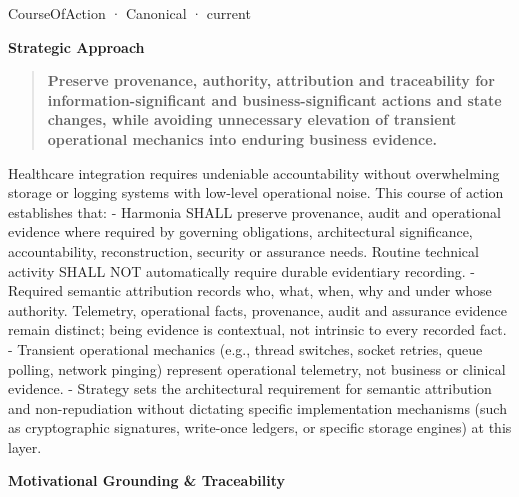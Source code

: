 \label{element:fd00bdbdc2234a208c5045aa69279db8}
{\small CourseOfAction · Canonical · current}\par

\par\medskip\textbf{Strategic Approach}\par


\begin{quote}


\textbf{Preserve provenance, authority, attribution and traceability for information-significant and business-significant actions and state changes, while avoiding unnecessary elevation of transient operational mechanics into enduring business evidence.}



\end{quote}


Healthcare integration requires undeniable accountability without overwhelming storage or logging systems with low-level operational noise. This course of action establishes that:
- Harmonia SHALL preserve provenance, audit and operational evidence where required by governing obligations, architectural significance, accountability, reconstruction, security or assurance needs. Routine technical activity SHALL NOT automatically require durable evidentiary recording.
- Required semantic attribution records who, what, when, why and under whose authority. Telemetry, operational facts, provenance, audit and assurance evidence remain distinct; being evidence is contextual, not intrinsic to every recorded fact.
- Transient operational mechanics (e.g., thread switches, socket retries, queue polling, network pinging) represent operational telemetry, not business or clinical evidence.
- Strategy sets the architectural requirement for semantic attribution and non-repudiation without dictating specific implementation mechanisms (such as cryptographic signatures, write-once ledgers, or specific storage engines) at this layer.



\par\medskip\textbf{Motivational Grounding \& Traceability}\par


